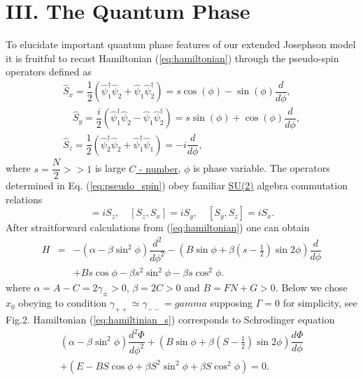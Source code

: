 \documentclass[aps,prl,preprint,groupedaddress]{revtex4-1}
\begin{document}
\section{III. The Quantum Phase}
To elucidate important quantum phase features  of our extended Josephson model  it is fruitful to recast Hamiltonian (\ref{eq:hamiltonian}) through the pseudo-spin operators defined as 
\begin{subequations}
\begin{align}
\hat{S}_x = \dfrac{1}{2}(\hat{\psi}_1^\dag\hat{\psi}_2+\hat{\psi}_1\hat{\psi}_2^\dag) = s\cos(\phi)-\sin(\phi)\dfrac{d}{d\phi}, \\[10pt]
\quad \hat{S}_y = \dfrac{i}{2}(\hat{\psi}_1^\dag\hat{\psi}_2-\hat{\psi}_1\hat{\psi}_2^\dag) = s\sin(\phi)+\cos(\phi)\dfrac{d}{d\phi}, \\[10pt]
\hat{S}_z = \dfrac{1}{2}(\hat{\psi}_2^\dag\hat{\psi}_2+\hat{\psi}_1^\dag\hat{\psi}_1) = -i\dfrac{d}{d\phi},
\end{align}
\label{eq:pseudo_spin}
\end{subequations}
where $s = \dfrac{N}{2} >> 1$ is large \underline{ $C$ - number}, $\phi$ is phase variable. The operators determined in Eq. (\ref{eq:pseudo_spin}) obey familiar \underline{ SU(2)} algebra commutation relations
\begin{equation}
[S_x, S_y] = iS_z,  \quad[S_z, S_x] = iS_y,  \quad[S_y, S_z] = iS_x.
\label{eq:commutation_relations}
\end{equation}
After straitforward calculations from (\ref{eq:hamiltonian}) one can obtain
\begin{equation}
\begin{array}{lcl}
H & = & -(\alpha - \beta \sin^2 \phi) \dfrac{d^2}{d \phi^2} - (B \sin \phi + \beta (s - \frac{1}{2}) \sin 2 \phi) \dfrac{d}{d \phi} \\[10pt]
&& + Bs \cos \phi - \beta s^2 \sin^2 \phi - \beta s \cos^2 \phi.
\end{array}
\label{eq:hamiltinian_s}
\end{equation}
where $\alpha = A - C = 2\gamma_{\pm} > 0$, $\beta = 2C > 0$ and $B = FN + G > 0$. Below we chose $x_0$ obeying to condition $\gamma_{++} \simeq \gamma_{--} = gamma$ supposing $\Gamma = 0$ for simplicity, see Fig.2.
Hamiltonian (\ref{eq:hamiltinian_s}) corresponds to Schrodinger equation
\begin{equation}
\begin{array}{l}
(\alpha - \beta \sin^2 \phi) \dfrac{d^2 \Phi}{d \phi^2} + (B \sin \phi + \beta (S - \frac{1}{2}) \sin 2\phi) \dfrac{d \Phi}{d \phi} \\[10pt]
+ (E - BS \cos \phi + \beta S^2 \sin^2 \phi + \beta S \cos^2 \phi) = 0.
\end{array}
\label{eq:Schrodinger}
\end{equation}
\end{document}
